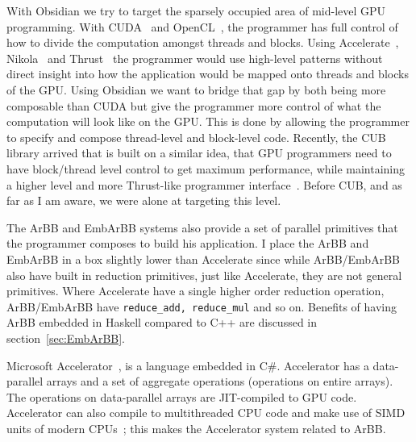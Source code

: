 \documentclass[a4paper]{book}
\begin{document}
With Obsidian we try to target the sparsely occupied area of mid-level GPU programming. With 
CUDA~\citet{wwwcuda} and OpenCL~\citet{OpenCL}, the programmer has full control of how to divide 
the computation amongst threads and blocks. Using Accelerate~\citet{ACCELERATEDAMP11}, 
Nikola~\citet{NIKOLA} 
and Thrust~\citet{THRUST} the programmer would use 
high-level patterns without direct insight into how the application would be mapped onto 
threads and blocks of the GPU. Using Obsidian we want to bridge that gap by both being 
more composable than CUDA but give the programmer more control of what the computation will 
look like on the GPU. This is done by allowing the programmer to specify and compose 
thread-level and block-level code. Recently, the CUB library arrived that is built on a 
similar idea, that GPU programmers need to have block/thread level control to get maximum 
performance, while maintaining a higher level and more Thrust-like programmer 
interface~\citet{CUB}. Before CUB, and as far as I am aware, we were alone at targeting 
this level.  

The ArBB and EmbArBB systems also provide a set of parallel primitives that the programmer
composes to build his application. I place the ArBB and EmbArBB in a box slightly lower than 
Accelerate since while ArBB/EmbArBB also have built in reduction primitives, just like Accelerate, 
they are not general primitives. Where Accelerate have a single higher order reduction 
operation, ArBB/EmbArBB have {\tt reduce\_add, reduce\_mul} and so on. Benefits of 
having ArBB embedded in Haskell compared to C++ are discussed in section~\ref{sec:EmbArBB}.

Microsoft Accelerator~\citet{ACCELERATOR}, is a language embedded in C\#. Accelerator has
a data-parallel arrays and a set of aggregate operations (operations on entire arrays). The 
operations on data-parallel arrays are JIT-compiled to GPU code. Accelerator can also 
compile to multithreaded CPU code and make use of SIMD units of modern 
CPUs~\citet{ACCELERATORCPU}; this makes the Accelerator system related to ArBB. 
\end{document}
